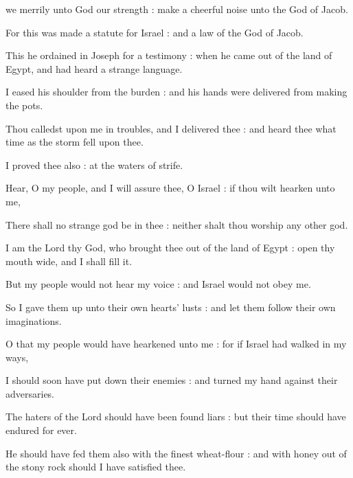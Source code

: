 
 we merrily unto God our strength : make a cheerful noise unto the God of Jacob.\par
{}
For this was made a statute for Israel : and a law of the God of Jacob.\par
{}This he ordained in Joseph for a testimony : when he came out of the land of Egypt, and had heard a strange language.\par
{}I eased his shoulder from the burden : and his hands were delivered from making the pots.\par
{}Thou calledst upon me in troubles, and I delivered thee : and heard thee what time as the storm fell upon thee.\par
{}I proved thee also : at the waters of strife.\par
{}Hear, O my people, and I will assure thee, O Israel : if thou wilt hearken unto me,\par
{}There shall no strange god be in thee : neither shalt thou worship any other god.\par
{}I am the Lord thy God, who brought thee out of the land of Egypt : open thy mouth wide, and I shall fill it.\par
{}But my people would not hear my voice : and Israel would not obey me.\par
{}So I gave them up unto their own hearts' lusts : and let them follow their own imaginations.\par
{}O that my people would have hearkened unto me : for if Israel had walked in my ways,\par
{}I should soon have put down their enemies : and turned my hand against their adversaries.\par
{}The haters of the Lord should have been found liars : but their time should have endured for ever.\par
{}He should have fed them also with the finest wheat-flour : and with honey out of the stony rock should I have satisfied thee.\par


